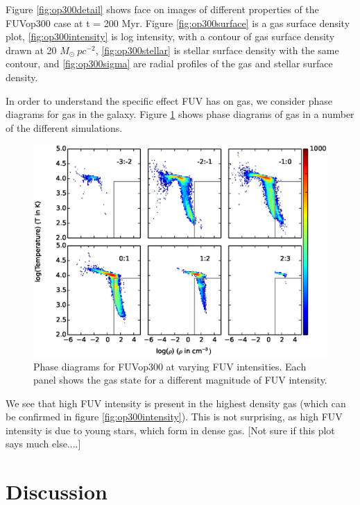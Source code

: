 Figure \ref{fig:op300detail} shows face on images of different properties of the FUVop300 case at t = 200 Myr. Figure \ref{fig:op300surface} is a gas surface density plot, \ref{fig:op300intensity} is log intensity, with a contour of gas surface density drawn at 20 $M_{\odot}~pc^{-2}$, \ref{fig:op300stellar} is stellar surface density with the same contour, and \ref{fig:op300sigma} are radial profiles of the gas and stellar surface density.

In order to understand the specific effect FUV has on gas, we consider phase diagrams for gas in the galaxy. Figure \ref{fig:phasediagrams} shows phase diagrams of gas in a number of the different simulations.

\begin{figure}
\includegraphics[width=\textwidth]{graphics/phaseRadFUV_J300200.eps}
\caption[Phase diagrams of gas with different FUV intensity.]{Phase diagrams for FUVop300 at varying FUV intensities. Each panel shows the gas state for a different magnitude of FUV intensity.}
\label{fig:phasediagrams}
\end{figure}

We see that high FUV intensity is present in the highest density gas (which can be confirmed in figure \ref{fig:op300intensity}). This is not surprising, as high FUV intensity is due to young stars, which form in dense gas. [Not sure if this plot says much else....]

\section{Discussion}
\label{sec:discussion}



